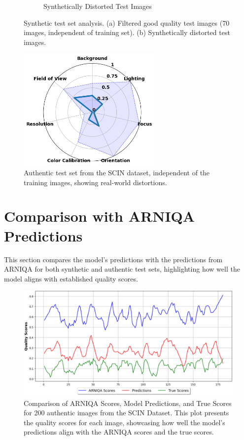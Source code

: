 \begin{figure}[ht]
\begin{subfigure}[b]{0.48\textwidth}
        \caption{Synthetically Distorted Test Images}
        \label{fig:test_70_synthetic}
    \end{subfigure}
    \hfill
    \caption{Synthetic test set analysis. (a) Filtered good quality test images (70 images, independent of training set). (b) Synthetically distorted test images.}
    \label{fig:T1}
\end{figure}

\begin{figure}[ht]
    \centering
    \includegraphics[keepaspectratio,width=7cm]{img/hept/test_200.png}
    \caption{Authentic test set from the SCIN dataset, independent of the training images, showing real-world distortions.}
    \label{fig:T2}
\end{figure}

\section{Comparison with ARNIQA Predictions}
\label{sec:ComparisonARNIQA}
This section compares the model’s predictions with the predictions from ARNIQA for both synthetic and authentic test sets, highlighting how well the model aligns with established quality scores. \par
\begin{figure}[ht]
    \centering
    \includegraphics[keepaspectratio,width=15cm]{img/hept/test_200_arniqa.png}
    \caption{Comparison of ARNIQA Scores, Model Predictions, and True Scores for 200 authentic images from the SCIN Dataset. This plot presents the quality scores for each image, showcasing how well the model’s predictions align with the ARNIQA scores and the true scores.}
    \label{fig:T2A}
\end{figure}

